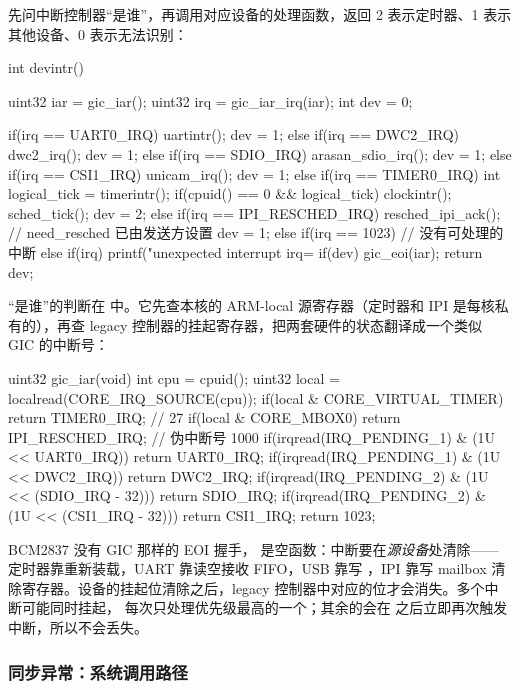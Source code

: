  先问中断控制器“是谁”，再调用对应设备的处理函数，返回 2 表示定时器、1 表示其他设备、0 表示无法识别：

\begin{ccode}
int devintr()
{
  uint32 iar = gic_iar();
  uint32 irq = gic_iar_irq(iar);
  int dev = 0;

  if(irq == UART0_IRQ){         uartintr();        dev = 1; }
  else if(irq == DWC2_IRQ){     dwc2_irq();        dev = 1; }
  else if(irq == SDIO_IRQ){     arasan_sdio_irq(); dev = 1; }
  else if(irq == CSI1_IRQ){     unicam_irq();      dev = 1; }
  else if(irq == TIMER0_IRQ){
    int logical_tick = timerintr();
    if(cpuid() == 0 && logical_tick)
      clockintr();
    sched_tick();
    dev = 2;
  } else if(irq == IPI_RESCHED_IRQ){
    resched_ipi_ack();          // need_resched 已由发送方设置
    dev = 1;
  } else if(irq == 1023){
    // 没有可处理的中断
  } else if(irq){
    printf("unexpected interrupt irq=%
  }
  if(dev)
    gic_eoi(iar);
  return dev;
}
\end{ccode}

“是谁”的判断在  中。它先查本核的 ARM-local 源寄存器（定时器和 IPI 是每核私有的），再查 legacy 控制器的挂起寄存器，把两套硬件的状态翻译成一个类似 GIC 的中断号：

\begin{ccode}
uint32 gic_iar(void)
{
  int cpu = cpuid();
  uint32 local = localread(CORE_IRQ_SOURCE(cpu));
  if(local & CORE_VIRTUAL_TIMER)  return TIMER0_IRQ;        // 27
  if(local & CORE_MBOX0)          return IPI_RESCHED_IRQ;   // 伪中断号 1000
  if(irqread(IRQ_PENDING_1) & (1U << UART0_IRQ))       return UART0_IRQ;
  if(irqread(IRQ_PENDING_1) & (1U << DWC2_IRQ))        return DWC2_IRQ;
  if(irqread(IRQ_PENDING_2) & (1U << (SDIO_IRQ - 32))) return SDIO_IRQ;
  if(irqread(IRQ_PENDING_2) & (1U << (CSI1_IRQ - 32))) return CSI1_IRQ;
  return 1023;
}
\end{ccode}

BCM2837 没有 GIC 那样的 EOI 握手， 是空函数：中断要在\emph{源设备}处清除——定时器靠重新装载，UART 靠读空接收 FIFO，USB 靠写 ，IPI 靠写 mailbox 清除寄存器。设备的挂起位清除之后，legacy 控制器中对应的位才会消失。多个中断可能同时挂起， 每次只处理优先级最高的一个；其余的会在  之后立即再次触发中断，所以不会丢失。

\subsubsection{同步异常：系统调用路径}


